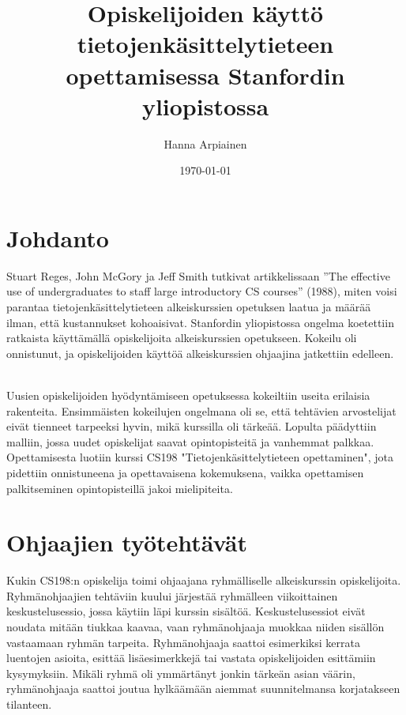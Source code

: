 \documentclass[finnish]{tktltiki2}
\title{﻿Opiskelijoiden käyttö tietojenkäsittelytieteen opettamisessa Stanfordin yliopistossa}
\author{Hanna Arpiainen}
\date{\today}
\theoremstyle{definition}
\theoremstyle{remark}
\begin{document}
\maketitle
\makeabstract

\tableofcontents
\newpage



\section{Johdanto}

Stuart Reges, John McGory ja Jeff Smith tutkivat artikkelissaan ”The effective use of undergraduates to staff large introductory CS courses” (1988), miten voisi parantaa tietojenkäsittelytieteen alkeiskurssien opetuksen laatua ja määrää ilman, että kustannukset kohoaisivat. Stanfordin yliopistossa ongelma koetettiin ratkaista käyttämällä opiskelijoita alkeiskurssien opetukseen. Kokeilu oli onnistunut, ja opiskelijoiden käyttöä alkeiskurssien ohjaajina jatkettiin edelleen. 

\\

Uusien opiskelijoiden hyödyntämiseen opetuksessa kokeiltiin useita erilaisia rakenteita. Ensimmäisten kokeilujen ongelmana oli se, että  tehtävien arvostelijat eivät tienneet tarpeeksi hyvin, mikä kurssilla oli tärkeää. Lopulta päädyttiin malliin, jossa uudet opiskelijat saavat opintopisteitä ja vanhemmat palkkaa. Opettamisesta luotiin kurssi CS198 "Tietojenkäsittelytieteen opettaminen", jota pidettiin onnistuneena ja opettavaisena kokemuksena, vaikka opettamisen palkitseminen opintopisteillä jakoi mielipiteita.





\section{Ohjaajien työtehtävät}

Kukin CS198:n opiskelija toimi ohjaajana ryhmälliselle alkeiskurssin opiskelijoita. Ryhmänohjaajien tehtäviin kuului järjestää ryhmälleen viikoittainen keskustelusessio, jossa käytiin läpi kurssin sisältöä. Keskustelusessiot eivät noudata mitään tiukkaa kaavaa, vaan ryhmänohjaaja muokkaa niiden sisällön vastaamaan ryhmän tarpeita. Ryhmänohjaaja saattoi esimerkiksi kerrata luentojen asioita, esittää lisäesimerkkejä tai vastata opiskelijoiden esittämiin kysymyksiin. Mikäli ryhmä oli ymmärtänyt jonkin tärkeän asian väärin, ryhmänohjaaja saattoi joutua hylkäämään aiemmat suunnitelmansa korjatakseen tilanteen.
\end{document}
